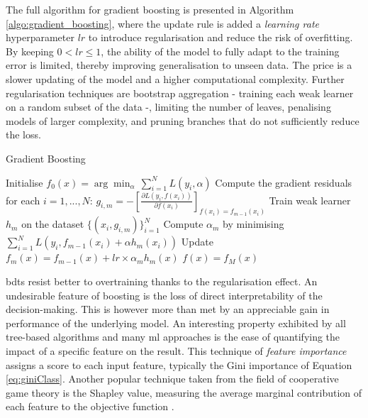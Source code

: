 The full algorithm for gradient boosting is presented in Algorithm \ref{algo:gradient_boosting}, where the update rule is added a \textit{learning rate} hyperparameter $lr$ to introduce regularisation and reduce the risk of overfitting. By keeping $0 < lr \leq 1$, the ability of the model to fully adapt to the training error is limited, thereby improving generalisation to unseen data. The price is a slower updating of the model and a higher computational complexity. Further regularisation techniques are bootstrap aggregation - training each weak learner on a random subset of the data -, limiting the number of leaves, penalising models of larger complexity, and pruning branches that do not sufficiently reduce the loss. \\

\begin{algorithm}
    \caption{Gradient Boosting \cite{MurphyML}}
    \label{algo:gradient_boosting}
    \begin{algorithmic}
    \State Initialise $f_0(x) = \arg\min_\alpha \,\sum_{i=1}^N L(y_i, \alpha)$
        \State Compute the gradient residuals for each $i= 1, ..., N$: $g_{i,m} = -\left[\frac{\partial L(y_i, f(x_i))}{\partial f(x_i)}\right]_{f(x_i) = f_{m-1}(x_i)}$
        \State Train weak learner $h_m$ on the dataset $\{(x_i, g_{i,m})\}_{i=1}^N$
        \State Compute $\alpha_m$ by minimising $\sum_{i=1}^N L(y_i, f_{m-1}(x_i) + \alpha h_m(x_i))$
        \State Update $f_m(x) = f_{m-1}(x) + lr \times \alpha_m h_m(x)$
    \EndFor
    \State \Return $f(x) = f_M(x)$
    \end{algorithmic}
\end{algorithm}

\glspl{bdt} resist better to overtraining thanks to the regularisation effect. An undesirable feature of boosting is the loss of direct interpretability of the decision-making. This is however more than met by an appreciable gain in performance of the underlying model. An interesting property exhibited by all tree-based algorithms and many \gls{ml} approaches is the ease of quantifying the impact of a specific feature on the result. This technique of \textit{feature importance} assigns a score to each input feature, typically the Gini importance of Equation \ref{eq:giniClass}. Another popular technique taken from the field of cooperative game theory is the Shapley value, measuring the average marginal contribution of each feature to the objective function \cite{shapley:book1952, Rozemberczki2022TheSV}.


